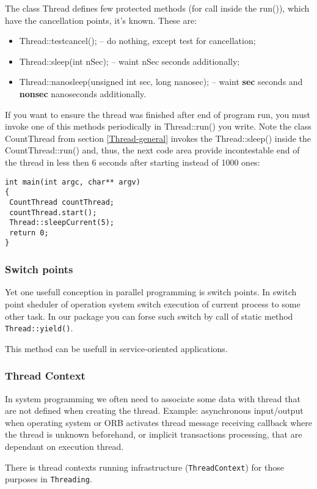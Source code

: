 \documentclass[10pt]{article}
\begin{document}
The class Thread defines few protected methods (for call inside the run()), which
have the cancellation points, it's known. These are:
\begin{itemize}
  \item Thread::testcancel(); -- do nothing, except test for cancellation;
  \item Thread::sleep(int nSec); -- waint nSec seconds additionally;
  \item Thread::nanosleep(unsigned int sec, long nanosec); -- waint {\bf sec } seconds and {\bf nonsec } nanoseconds additionally.
\end{itemize}
If you want to ensure the thread was finished after end of program run, 
you must invoke one of this methods periodically in Thread::run() you write.
Note the class CountThread from section \ref{Thread-general} invokes the Thread::sleep() 
inside the CountThread::run() and, thus, the next code area provide incontestable end of the thread
in less then 6 seconds after starting instead of 1000 ones:
\begin{verbatim}
int main(int argc, char** argv)
{
 CountThread countThread;
 countThread.start();
 Thread::sleepCurrent(5);
 return 0;
}
\end{verbatim}


\subsubsection{ Switch points }

  Yet one usefull conception in parallel programming is switch points. 
In switch point sheduler of operation system switch execution of current
process to some other task. In our package you can forse such switch by call
of static method \verb|Thread::yield()|.

 This method can be usefull in service-oriented applications.

\subsubsection{ Thread Context  }

 In system programming we often need to associate some data with thread that are not defined 
when creating the thread. Example: asynchronous input/output when operating system or ORB
activates thread message receiving callback where  the thread is unknown beforehand, or 
implicit transactions processing, that are dependant on execution thread.

 There is thread contexts running infrastructure (\verb|ThreadContext|) 
for those purposes in \verb|Threading|.
\end{document}
